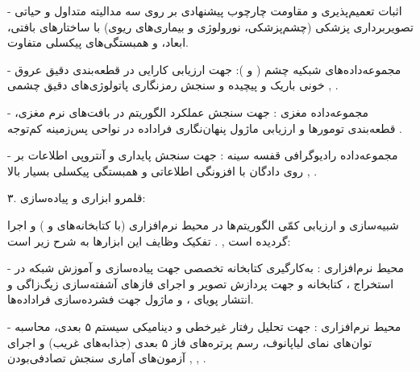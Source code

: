 {-} اثبات تعمیم‌پذیری و مقاومت چارچوب پیشنهادی بر روی سه مدالیته متداول و حیاتی تصویربرداری پزشکی (چشم‌پزشکی، نورولوژی و بیماری‌های ریوی) با ساختارهای بافتی، ابعاد، و همبستگی‌های پیکسلی متفاوت.\par

{-} مجموعه‌داده‌های شبکیه چشم ( و ): جهت ارزیابی کارایی  در قطعه‌بندی دقیق عروق خونی باریک و پیچیده و سنجش رمزنگاری پاتولوژی‌های دقیق چشمی , .\par

{-} مجموعه‌داده  مغزی : جهت سنجش عملکرد الگوریتم در بافت‌های نرم مغزی، قطعه‌بندی تومورها و ارزیابی ماژول پنهان‌نگاری فراداده در نواحی پس‌زمینه کم‌توجه .\par

{-} مجموعه‌داده رادیوگرافی قفسه سینه : جهت سنجش پایداری و آنتروپی اطلاعات بر روی دادگان با افزونگی اطلاعاتی و همبستگی پیکسلی بسیار بالا , .\par



۳. قلمرو ابزاری و پیاده‌سازی:\par

شبیه‌سازی و ارزیابی کمّی الگوریتم‌ها در محیط نرم‌افزاری  (با کتابخانه‌های  و ) و  اجرا گردیده است , . تفکیک وظایف این ابزارها به شرح زیر است:\par

{-} محیط نرم‌افزاری : به‌کارگیری کتابخانه تخصصی  جهت پیاده‌سازی و آموزش شبکه  در استخراج ، کتابخانه  و  جهت پردازش تصویر و اجرای فازهای آشفته‌سازی زیگ‌زاگی و انتشار پویای ، و ماژول  جهت فشرده‌سازی فراداده‌ها.\par

{-} محیط نرم‌افزاری : جهت تحلیل رفتار غیرخطی و دینامیکی سیستم ۵ بعدی، محاسبه توان‌های نمای لیاپانوف، رسم پرتره‌های فاز ۵ بعدی (جذابه‌های غریب) و اجرای آزمون‌های آماری سنجش تصادفی‌بودن  , , .\par

